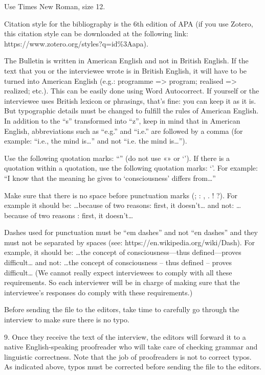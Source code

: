 \documentclass[11pt]{article}
\begin{document}
Use Times New Roman, size 12.\par

Citation style for the bibliography is the 6th edition of APA (if you use Zotero, this citation style can be downloaded at the following link: https://www.zotero.org/styles?q=id\%3Aapa).\par

The Bulletin is written in American English and not in British English. If the text that you or the interviewee wrote is in British English, it will have to be turned into American English (e.g.: programme => program; realised => realized; etc.). This can be easily done using Word Autocorrect. If yourself or the interviewee uses British lexicon or phrasings, that’s fine: you can keep it as it is. But typographic details must be changed to fulfill the rules of American English. In addition to the “s” transformed into “z”, keep in mind that in American English, abbreviations such as “e.g.” and “i.e.” are followed by a comma (for example: “i.e., the mind is…” and not “i.e. the mind is…”).\par

Use the following quotation marks: “” (do not use «» or ‘’). If there is a quotation within a quotation, use the following quotation marks: ‘’. For example: “I know that the meaning he gives to ‘consciousness’ differs from…”\par

Make sure that there is no space before punctuation marks (; : , . ! ?). For example it should be: …because of two reasons: first, it doesn’t… and not: …because of two reasons : first, it doesn’t…\par

Dashes used for punctuation must be “em dashes” and not “en dashes” and they must not be separated by spaces (see: https://en.wikipedia.org/wiki/Dash). For example, it should be: …the concept of consciousness—thus defined—proves difficult… and not: …the concept of consciousness – thus defined – proves difficult…
(We cannot really expect interviewees to comply with all these requirements. So each interviewer will be in charge of making sure that the interviewee’s responses do comply with these requirements.)\par

Before sending the file to the editors, take time to carefully go through the interview to make sure there is no typo.\par

9. Once they receive the text of the interview, the editors will forward it to a native English-speaking proofreader who will take care of checking grammar and linguistic correctness. Note that the job of proofreaders is not to correct typos. As indicated above, typos must be corrected before sending the file to the editors.\par
\end{document}

